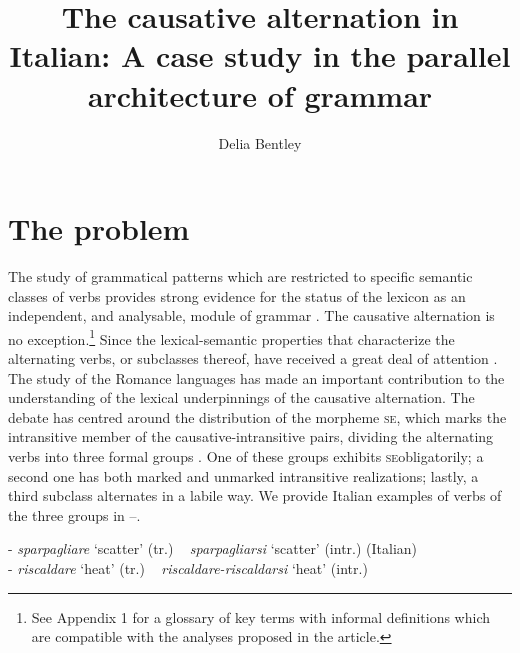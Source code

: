 \documentclass[output=paper,colorlinks,citecolor=brown
]{langscibook}
\author{Delia Bentley\orcid{}\affiliation{University of Manchester}}
\title[The causative alternation in Italian]{The causative alternation in Italian: A case study in the parallel architecture of grammar}
\begin{document}
\maketitle


\section{The problem}
\label{bentley_section_1}
The study of grammatical patterns which are restricted to specific semantic classes of verbs provides strong evidence for the status of the lexicon as an independent, and analysable, module of grammar \citep{pinker1989learnability,pinker2013secret,levin1993english}. The causative alternation is no exception.\footnote{See Appendix 1 for a glossary of key terms with informal definitions which are compatible with the analyses proposed in the article.}  Since \citet[332–337]{jespersen1927modern} the lexical-semantic properties that characterize the alternating verbs, or subclasses thereof, have received a great deal of attention \citep[etc.]{haspelmath1993more,levin1995unaccusativity,kiparsky1997remarks,chierchia1989semantics,comrie2006transitivity,schafer2009causative,samardzic2012meaning}. The study of the Romance languages has made an important contribution to the understanding of the lexical underpinnings of the causative alternation. The debate has centred around the distribution of the morpheme \textsc{se}, which marks the intransitive member of the causative-intransitive pairs, dividing the alternating verbs into three formal groups \citep[etc.]{zribi1987reflexivite,labelle1992change,alexiadou2006properties, alexiadou2015external, legendre2010french,cennamo2011anticausative,cennamo2012aspectual,kailuweit2012construcciones,martin2014anticausatives,vivanco2021scalar}. One of these groups exhibits \textsc{se}obligatorily; a second one has both marked and unmarked intransitive realizations; lastly, a third subclass alternates in a labile way. We provide Italian examples of verbs of the three groups in --.

\ea
\label{bentley_example_1}
\ea	\label{bentley_example_1a}  - \textit{sparpagliare} ‘scatter’ (tr.) ~ \textit{sparpagliarsi} ‘scatter’ (intr.) 	(Italian) \\

\ex	\label{bentley_example_1b} 
 - \textit{riscaldare} ‘heat’ (tr.) ~ \textit{riscaldare-riscaldarsi} ‘heat’ (intr.)  \\
\end{document}
